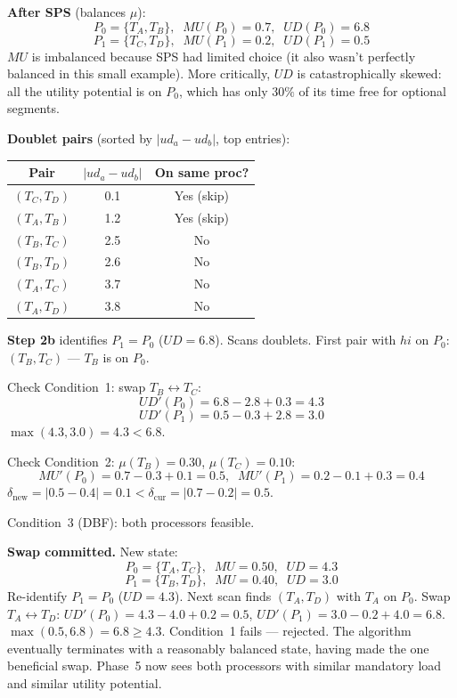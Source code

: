 \documentclass[10pt,twocolumn]{article}
\begin{document}
\textbf{After SPS} (balances $\mu$):
\[
  P_0 = \{T_A, T_B\},\;\; MU(P_0)=0.7,\;\; UD(P_0)=6.8
\]
\[
  P_1 = \{T_C, T_D\},\;\; MU(P_1)=0.2,\;\; UD(P_1)=0.5
\]
$MU$ is imbalanced because SPS had limited choice (it also wasn't perfectly
balanced in this small example). More critically, $UD$ is catastrophically
skewed: all the utility potential is on $P_0$, which has only $30\%$ of its
time free for optional segments.

\textbf{Doublet pairs} (sorted by $|ud_a - ud_b|$, top entries):

\begin{center}
\small
\begin{tabular}{ccc}
\toprule
Pair & $|ud_a - ud_b|$ & On same proc? \\
\midrule
$(T_C, T_D)$ & 0.1 & Yes (skip) \\
$(T_A, T_B)$ & 1.2 & Yes (skip) \\
$(T_B, T_C)$ & 2.5 & No \\
$(T_B, T_D)$ & 2.6 & No \\
$(T_A, T_C)$ & 3.7 & No \\
$(T_A, T_D)$ & 3.8 & No \\
\bottomrule
\end{tabular}
\end{center}

\textbf{Step 2b} identifies $P_1 = P_0$ ($UD=6.8$). Scans doublets. First
pair with $\mathit{hi}$ on $P_0$: $(T_B, T_C)$ --- $T_B$ is on $P_0$.

Check Condition~1: swap $T_B \leftrightarrow T_C$:
\[
  UD'(P_0) = 6.8 - 2.8 + 0.3 = 4.3
\]
\[
  UD'(P_1) = 0.5 - 0.3 + 2.8 = 3.0
\]
$\max(4.3, 3.0) = 4.3 < 6.8$. \checkmark

Check Condition~2: $\mu(T_B)=0.30$, $\mu(T_C)=0.10$:
\[
  MU'(P_0)=0.7-0.3+0.1=0.5,\;\; MU'(P_1)=0.2-0.1+0.3=0.4
\]
$\delta_{\text{new}}=|0.5-0.4|=0.1 < \delta_{\text{cur}}=|0.7-0.2|=0.5$. \checkmark

Condition~3 (DBF): both processors feasible. \checkmark

\textbf{Swap committed.} New state:
\[
  P_0 = \{T_A, T_C\},\;\; MU=0.50,\;\; UD=4.3
\]
\[
  P_1 = \{T_B, T_D\},\;\; MU=0.40,\;\; UD=3.0
\]
Re-identify $P_1 = P_0$ ($UD=4.3$). Next scan finds $(T_A, T_D)$ with $T_A$
on $P_0$. Swap $T_A \leftrightarrow T_D$:
$UD'(P_0)=4.3-4.0+0.2=0.5$, $UD'(P_1)=3.0-0.2+4.0=6.8$.
$\max(0.5, 6.8)=6.8 \geq 4.3$. Condition~1 fails --- rejected. The algorithm
eventually terminates with a reasonably balanced state, having made the one
beneficial swap. Phase~5 now sees both processors with similar mandatory load
and similar utility potential.
\end{document}
